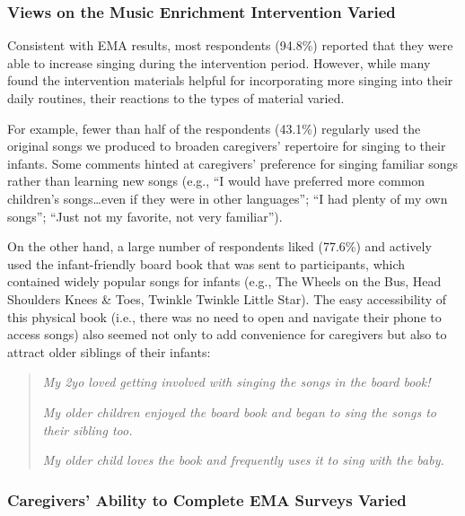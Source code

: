 \documentclass[
]{article}
\begin{document}
\subsubsection*{Views on the Music Enrichment Intervention
Varied}\label{views-on-the-music-enrichment-intervention-varied}

Consistent with EMA results, most respondents (94.8\%) reported that
they were able to increase singing during the intervention period.
However, while many found the intervention materials helpful for
incorporating more singing into their daily routines, their reactions to
the types of material varied.

For example, fewer than half of the respondents (43.1\%) regularly used
the original songs we produced to broaden caregivers' repertoire for
singing to their infants. Some comments hinted at caregivers' preference
for singing familiar songs rather than learning new songs (e.g., ``I
would have preferred more common children's songs\ldots even if they
were in other languages''; ``I had plenty of my own songs''; ``Just not
my favorite, not very familiar'').

On the other hand, a large number of respondents liked (77.6\%) and
actively used the infant-friendly board book that was sent to
participants, which contained widely popular songs for infants (e.g.,
The Wheels on the Bus, Head Shoulders Knees \& Toes, Twinkle Twinkle
Little Star). The easy accessibility of this physical book (i.e., there
was no need to open and navigate their phone to access songs) also
seemed not only to add convenience for caregivers but also to attract
older siblings of their infants:

\begin{quote}
\textit{My 2yo loved getting involved with singing the songs in the board book!}
  
\textit{My older children enjoyed the board book and began to sing the songs to their sibling too.}
  
\textit{My older child loves the book and frequently uses it to sing with the baby.}
\end{quote}

\subsubsection*{Caregivers' Ability to Complete EMA Surveys
Varied}\label{caregivers-ability-to-complete-ema-surveys-varied}
\end{document}
